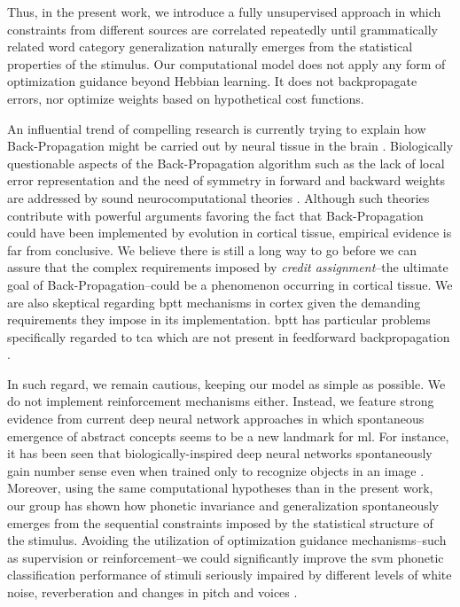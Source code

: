 {Thus, in the present work, we introduce a fully unsupervised approach in which constraints from different sources are correlated repeatedly until grammatically related word category generalization naturally emerges from the statistical properties of the stimulus. Our computational model does not apply any form of optimization guidance beyond Hebbian learning. It does not backpropagate errors, nor optimize weights based on hypothetical cost functions. 

An influential trend of compelling research is currently trying to explain how Back-Propagation might be carried out by neural tissue in the brain \cite{WHITTINGTON2019235}. Biologically questionable aspects of the Back-Propagation algorithm such as the lack of local error representation and the need of symmetry in forward and backward weights are addressed by sound neurocomputational theories \cite{10.7554/eLife.22901, Lillicrap_2016}. Although such theories contribute with powerful arguments favoring the fact that Back-Propagation could have been implemented by evolution in cortical tissue, empirical evidence is far from conclusive. We believe there is still a long way to go before we can assure that the complex requirements imposed by \emph{credit assignment}--the ultimate goal of Back-Propagation--could be a phenomenon occurring in cortical tissue. We are also skeptical regarding \gls{bptt} mechanisms in cortex given the demanding requirements they impose in its implementation. \gls{bptt} has particular problems specifically regarded to \gls{tca} which are not present in feedforward backpropagation \cite{LILLICRAP201982}.

In such regard, we remain cautious, keeping our model as simple as possible. We do not implement reinforcement mechanisms either. Instead, we feature strong evidence from current deep neural network approaches in which spontaneous emergence of abstract concepts seems to be a new landmark for \gls{ml}. For instance, it has been seen that biologically-inspired deep neural networks spontaneously gain number sense even when trained only to recognize objects in an image \cite{Nasreaav7903}. Moreover, using the same computational hypotheses than in the present work, our group has shown how phonetic invariance and generalization spontaneously emerges from the sequential constraints imposed by the statistical structure of the stimulus. Avoiding the utilization of optimization guidance mechanisms--such as supervision or reinforcement--we could significantly improve the \gls{svm} phonetic classification performance of stimuli seriously impaired by different levels of white noise, reverberation and changes in pitch and voices \cite{10.1371/journal.pone.0217966}.

}
